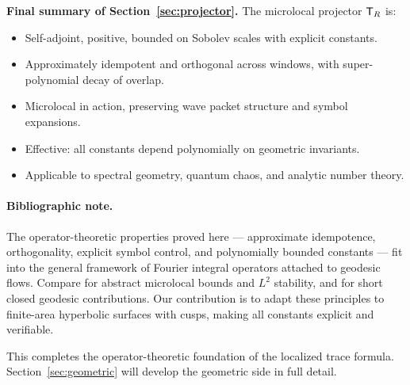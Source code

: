 \bigskip
\noindent\textbf{Final summary of Section~\ref{sec:projector}.}  
The microlocal projector $\mathsf{T}_R$ is:
\begin{itemize}
\item Self-adjoint, positive, bounded on Sobolev scales with explicit constants.  
\item Approximately idempotent and orthogonal across windows, with super-polynomial decay of overlap.  
\item Microlocal in action, preserving wave packet structure and symbol expansions.  
\item Effective: all constants depend polynomially on geometric invariants.  
\item Applicable to spectral geometry, quantum chaos, and analytic number theory.  
\end{itemize}

\paragraph{Bibliographic note.}  
The operator-theoretic properties proved here --- approximate idempotence, orthogonality, explicit symbol control, and polynomially bounded constants --- fit into the general framework of Fourier integral operators attached to geodesic flows. Compare \cite{hormander1994III,sogge1993} for abstract microlocal bounds and $L^2$ stability, and \cite{duistermaatguillemin1975} for short closed geodesic contributions. Our contribution is to adapt these principles to finite-area hyperbolic surfaces with cusps, making all constants explicit and verifiable.

This completes the operator-theoretic foundation of the localized trace formula. Section~\ref{sec:geometric} will develop the geometric side in full detail.
